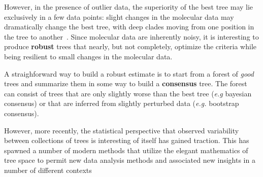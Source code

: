 However, in the presence of outlier data, the superiority of the best tree may lie exclusively in a few data points: slight changes in the molecular data may dramatically change the best tree, with deep clades moving from one position in the tree to another~\citep{Bar-Hen2008}. Since molecular data are inherently noisy, it is interesting to produce \textbf{robust} trees that nearly, but not completely, optimize the criteria while being resilient to small changes in the molecular data.

A straighforward way to build a robust estimate is to start from a forest of \emph{good} trees and summarize them in some way to build a \textbf{consensus} tree. The forest can consist of trees that are only slightly worse than the best tree (\emph{e.g} bayesian consensus) or that are inferred from slightly perturbed data (\emph{e.g.} bootstrap consensus). 

However,  more  recently,  the  statistical perspective that observed variability between collections of trees is interesting of itself has gained traction. This has spawned a number of modern methods that utilize the elegant mathematics of tree space to permit new data analysis methods and associated new insights in a number of different contexts